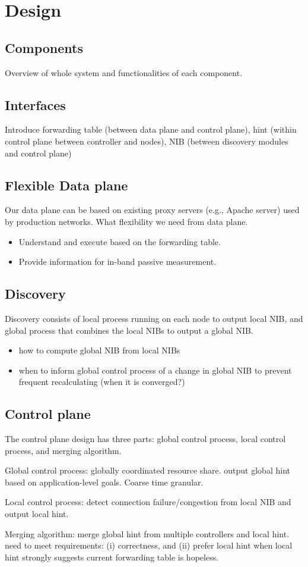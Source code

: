 \section{Design}

\subsection{Components}
Overview of whole system and functionalities of each component. 

\subsection{Interfaces}
Introduce forwarding table (between data plane and control plane), hint (within control plane between controller and nodes), NIB (between discovery modules and control plane)

\subsection{Flexible Data plane}
Our data plane can be based on existing proxy servers (e.g., Apache server) used by production networks. What flexibility we need from data plane.
\begin{itemize}
	\item Understand and execute based on the forwarding table.
	\item Provide information for in-band passive measurement.
\end{itemize}

\subsection{Discovery}
Discovery consists of local process running on each node to output local NIB, and global process that combines the local NIBs to output a global NIB.

\begin{itemize}
	\item how to compute global NIB from local NIBs
	\item when to inform global control process of a change in global NIB to prevent frequent recalculating (when it is converged?) 
\end{itemize}

\subsection{Control plane}
The control plane design has three parts: global control process, local control process, and merging algorithm.

Global control process: globally coordinated resource share. output global hint based on application-level goals. Coarse time granular.

Local control process: detect connection failure/congestion from local NIB and output local hint.

Merging algorithm: merge global hint from multiple controllers and local hint. need to meet requirements: (i) correctness, and (ii) prefer local hint when local hint strongly suggests current forwarding table is hopeless.
